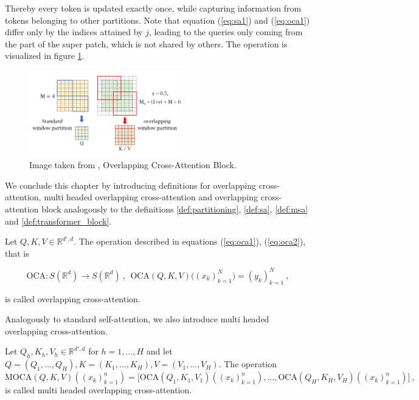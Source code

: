 Thereby every token is updated exactly once, 
while capturing information from tokens belonging to other partitions.
Note that equation (\ref{eq:sa1}) and (\ref{eq:oca1})
differ only by the indices attained by $j$,
leading to the queries only coming from the part of the super patch,
which is not shared by others.
The operation is visualized in figure \ref{fig:ocab}.

\begin{figure}[h!]
    \begin{center}
        \includegraphics[width=0.6\textwidth]{models/preliminaries/imgs/ocab.png}
    \end{center}
    \caption{Image taken from \cite{chenHATHybridAttention2024}, Overlapping Cross-Attention Block.}
    \label{fig:ocab}
\end{figure}

We conclude this chapter by introducing definitions for
overlapping cross-attention, multi headed overlapping cross-attention and overlapping cross-attention block
analogously to the definitions \ref{def:partitioning}, \ref{def:sa}, \ref{def:msa} and \ref{def:transformer_block}.

\begin{definition}
    \label{def:oca}
    Let $Q, K, V \in \mathbb R^{d', d}$.
    The operation described in equations (\ref{eq:oca1}), (\ref{eq:oca2}), that is

        $$ \text{OCA}: S(\mathbb R^{d}) \to S(\mathbb R^{d}) ~, 
        ~~ \text{OCA} (Q, K, V) \big( (x_k)_{k=1}^N \big) = (y_k)_{k=1}^N ~, $$

    \noindent is called overlapping cross-attention.
\end{definition}

Analogously to standard self-attention, 
we also introduce multi headed overlapping cross-attention.

\begin{definition}
    \label{def:moca}
    Let $Q_h, K_h, V_h \in \mathbb R^{d', d}$ for $h= 1,..., H$ and let $Q = (Q_1, ..., Q_H), K = (K_1, ..., K_H), V = (V_1, ..., V_H)$.
    The operation
        $$ \text{MOCA}(Q, K, V) \left((x_{k})_{k=1}^n \right) = \big[\text{OCA}(Q_1, K_1, V_1)\left((x_{k})_{k=1}^n \right), ..., \text{OCA}(Q_H, K_H, V_H)\left((x_{k})_{k=1}^n \right) \big] ~, $$
    \noindent is called multi headed overlapping cross-attention.
\end{definition}

